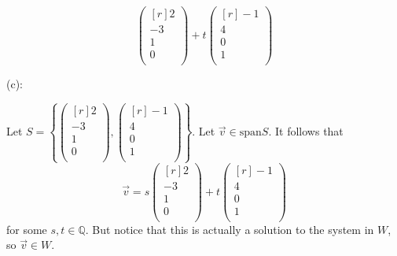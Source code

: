 \documentclass{article}
\theoremstyle{plain} %
\numberwithin{thm}{section} %
\theoremstyle{definition}
\begin{document}
\begin{question}{2}
\[\begin{pmatrix*}[r]
                 2 \\
                 -3 \\
                 1 \\
                 0 \\
            \end{pmatrix*}
            +t
            \begin{pmatrix*}[r]
                 -1 \\
                 4 \\
                 0 \\
                 1 \\
            \end{pmatrix*}
        \]

        \medskip

        (c):

        Let
        \(S = \left\{ \begin{pmatrix*}[r]
                        2 \\
                        -3 \\
                        1 \\
                        0 \\
                      \end{pmatrix*},
                      \begin{pmatrix*}[r]
                        -1 \\
                        4 \\
                        0 \\
                        1 \\
                      \end{pmatrix*}\right\} \).
        Let \(\vec{v} \in \mathrm{span} S\). It follows that
        \[
            \vec{v} = s\begin{pmatrix*}[r]
                2 \\
                -3 \\
                1 \\
                0 \\
           \end{pmatrix*}
           +t
           \begin{pmatrix*}[r]
                -1 \\
                4 \\
                0 \\
                1 \\
           \end{pmatrix*}
        \]
        for some \(s,t \in \mathbb{Q}\). But notice that this is actually a solution to the system in \(W\), so \(\vec{v} \in W\).


\end{question}
\end{document}
